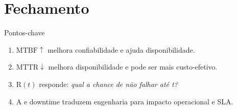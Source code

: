 \documentclass{beamer}
\newif\ifshowsolutions
\newcommand{\R}{\mathrm{R}}
\newcommand{\A}{\mathrm{A}}
\newcommand{\MTBF}{\mathrm{MTBF}}
\newcommand{\MTTR}{\mathrm{MTTR}}
\begin{document}
\ifshowsolutions
\begin{frame}{Solução do Desafio}
\small
\textbf{Dados:} 90 dias $= 2160\,h$, 7 incidentes, downtime total $= 3.5+0.8+4.2+1.5+2.0+6.0+1.0 = 19.0\,h$.

\vspace{0.3em}
\begin{itemize}
  \item $\MTBF = \dfrac{2160}{7} \approx 308.6\,h$

  \vspace{0.3em}
  \item $\MTTR = \dfrac{19.0}{7} \approx 2.71\,h$

  \vspace{0.3em}
  \item $\A = \dfrac{308.6}{308.6 + 2.71} \approx 0.99129 = 99.13\%$

  \vspace{0.3em}
  \item \textbf{SLA não cumprido}: meta era 99.9\%, obteve 99.13\%.\\
  Diferença: $99.9 - 99.13 = 0.77$ p.p. $\Rightarrow$ $\lceil 0.77 / 0.1 \rceil = 8$ faixas.\\
  Multa: $8 \times \text{R\$}\,50.000 = \textbf{R\$\,400.000}$.

  \vspace{0.3em}
  \item \textbf{Priorização}: o incidente \#6 (bug de concorrência, 6h) foi o mais longo.
  Eliminá-lo sozinho reduziria o downtime para 13h e elevaria \(\A\) para $\approx 99.40\%$ --- ainda insuficiente, mas o maior ganho individual.
\end{itemize}
\end{frame}
\fi









\section{Fechamento}

\begin{frame}{Pontos-chave}
\begin{enumerate}\setlength{\itemsep}{2em}
  \item \(\MTBF\uparrow\) melhora confiabilidade e ajuda disponibilidade.
  \item \(\MTTR\downarrow\) melhora disponibilidade e pode ser mais custo-efetivo.
  \item \(\R(t)\) responde: \textit{qual a chance de não falhar até t?}
  \item \(\A\) e downtime traduzem engenharia para impacto operacional e SLA.
\end{enumerate}
\end{frame}
\end{document}
